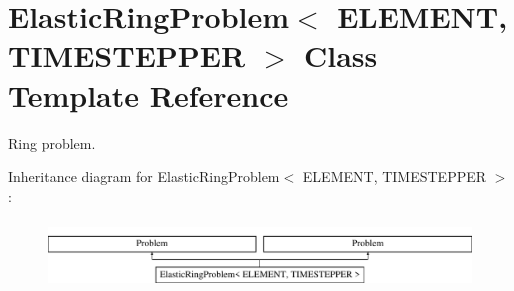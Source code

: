 \hypertarget{classElasticRingProblem}{}\section{Elastic\+Ring\+Problem$<$ E\+L\+E\+M\+E\+NT, T\+I\+M\+E\+S\+T\+E\+P\+P\+ER $>$ Class Template Reference}
\label{classElasticRingProblem}


Ring problem.  


Inheritance diagram for Elastic\+Ring\+Problem$<$ E\+L\+E\+M\+E\+NT, T\+I\+M\+E\+S\+T\+E\+P\+P\+ER $>$\+:\begin{figure}[H]
\begin{center}
\leavevmode
\includegraphics[height=1.848185cm]{classElasticRingProblem}
\end{center}
\end{figure}
